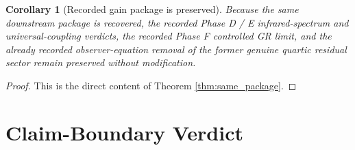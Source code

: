 \documentclass[11pt]{article}
\newtheorem{corollary}{Corollary}
\begin{document}
\begin{corollary}[Recorded gain package is preserved]
\label{cor:gains}
Because the same downstream package is recovered, the recorded Phase D / E infrared-spectrum and universal-coupling verdicts, the recorded Phase F controlled GR limit, and the already recorded observer-equation removal of the former genuine quartic residual sector remain preserved without modification.
\end{corollary}

\begin{proof}
This is the direct content of Theorem \ref{thm:same_package}.
\end{proof}

\section{Claim-Boundary Verdict}
\end{document}
